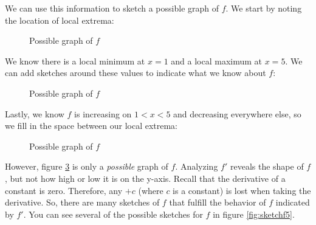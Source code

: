 We can use this information to sketch a possible graph of $f$. We start by 
noting the location of local extrema:
\begin{figure}[htbp]
	\centering
	\caption{Possible graph of $f$}
	\label{fig:sketchf2}
\end{figure}

We know there is a local minimum at $x=1$ and a local maximum at $x=5$. We can 
add sketches around these values to indicate what we know about $f$:
\begin{figure}[htbp]
	\centering
	\caption{Possible graph of $f$}
	\label{fig:sketchf3}
\end{figure}

Lastly, we know $f$ is increasing on $1<x<5$ and decreasing everywhere else, so 
we fill in the space between our local extrema:
\begin{figure}[htbp]
	\centering
	\caption{Possible graph of $f$}
	\label{fig:sketchf4}
\end{figure}

However, figure \ref{fig:sketchf4} is only a \textit{possible} graph of $f$. 
Analyzing $f'$ reveals the shape of $f$, but not how high or low it is on the 
y-axis. Recall that the derivative of a constant is zero. Therefore, any $+c$ 
(where $c$ is a constant) is lost when taking the derivative. So, there are 
many sketches of $f$ that fulfill the behavior of $f$ indicated by $f'$. You 
can see several of the possible sketches for $f$ in figure \ref{fig:sketchf5}. 

